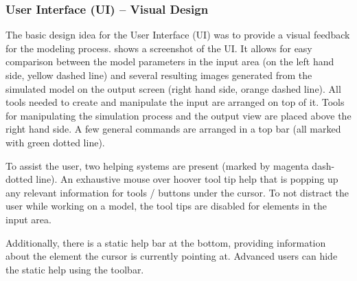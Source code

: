 

\subsubsection{User Interface (UI) -- Visual Design}
\label{sec:ui-vis}


The basic design idea for the User Interface (UI) was to provide a visual feedback for the modeling process.
 shows a screenshot of the UI.
It allows for easy comparison between the model parameters in the input area (on the left hand side, yellow dashed line) and several resulting images generated from the simulated model on the output screen (right hand side, orange dashed line).
All tools needed to create and manipulate the input are arranged on top of it.
Tools for manipulating the simulation process and the output view are placed above the right hand side.
A few general commands are arranged in a top bar (all marked with green dotted line).

To assist the user, two helping systems are present (marked by magenta dash-dotted line).
An exhaustive mouse over hoover tool tip help that is popping up any relevant information for tools / buttons under the cursor.
To not distract the user while working on a model, the tool tips are disabled for elements in the input area.

Additionally, there is a static help bar at the bottom, providing information about the element the cursor is currently pointing at.
Advanced users can hide the static help using the toolbar.

